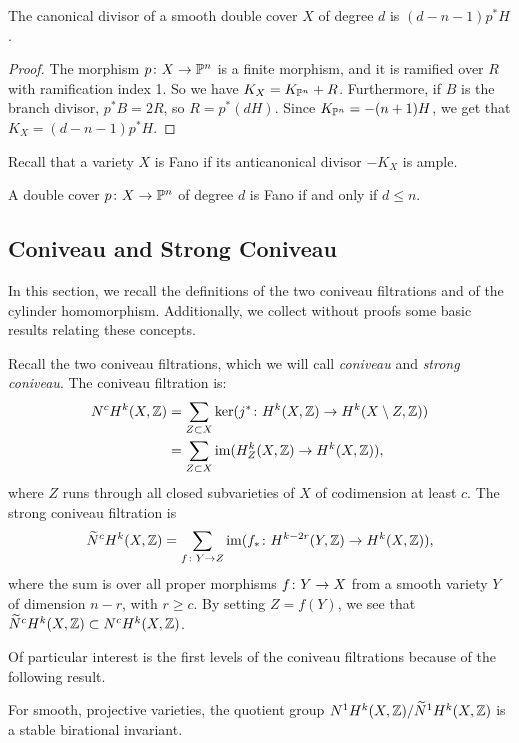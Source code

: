 \begin{proposition}
  The canonical divisor of a smooth double cover $X$ of degree $d$ is $(d-n-1)p^*H$.
\end{proposition}
\begin{proof}
  The morphism $p \from X \to \P^n$ is a finite morphism, and it is ramified over $R$ with ramification index 1. So we have $K_X = K_{\P^n}+R$. Furthermore, if $B$ is the branch divisor, $p^*B = 2R$, so $R = p^*(dH)$. Since $K_{\P^n} = -(n+1)H$, we get that $K_X = (d-n-1)p^*H$.
\end{proof}
Recall that a variety $X$ is Fano if its anticanonical divisor $-K_X$ is ample.
\begin{corollary}
	\label{cor:FanoBound}
  A double cover $p \from X \to \P^n$ of degree $d$ is Fano if and only if $d \leq n$.
\end{corollary}


\subsection{Coniveau and Strong Coniveau}
In this section, we recall the definitions of the two coniveau filtrations and of the cylinder homomorphism. Additionally, we collect without proofs some basic results relating these concepts. 

 Recall the two coniveau filtrations, which we will call \emph{coniveau} and \emph{strong coniveau}. The coniveau filtration is:
\[
\begin{split}
N^c H^k(X,\Z) &= \sum_{Z \subset X} \ker (j^* \from H^k(X,\Z) \to H^k(X \setminus Z,\Z)) \\
&= \sum_{Z \subset X} \im(H^k_Z(X,\Z) \to H^k(X,\Z)),
\end{split}
 \]
where $Z$ runs through all closed subvarieties of $X$ of codimension at least $c$.
The strong coniveau filtration is
\[\widetilde{N}^c H^k(X,\Z) = \sum_{f \from Y \to Z} \im(f_*\from H^{k-2r}(Y,\Z) \to H^k(X,\Z)),\]
where the sum is over all proper morphisms $f \from Y \to X$ from a smooth variety $Y$ of dimension $n-r$, with $r \geq c$. By setting $Z = f(Y)$, we see that $\widetilde{N}^c H^k(X,\Z) \subset N^c H^k(X,\Z)$.

Of particular interest is the first levels of the coniveau filtrations because of the following result.
\begin{proposition}
  For smooth, projective varieties, the quotient group $N^1H^k(X,\Z) / \widetilde{N}^1H^k(X,\Z)$ is a stable birational invariant.
\end{proposition}

